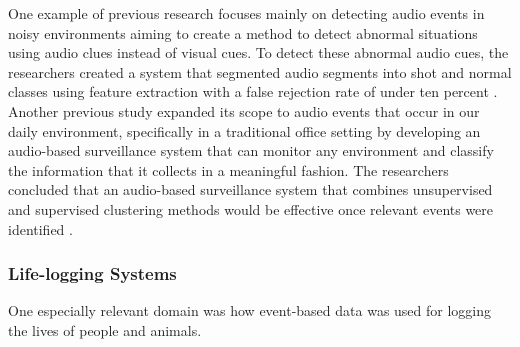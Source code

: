 \documentclass[doublespace,draft,nopageskip]{VTthesis} %
\begin{document}
One example of previous research focuses mainly on detecting audio events in noisy environments aiming to create a method to detect abnormal situations using audio clues instead of visual cues. To detect these abnormal audio cues, the researchers created a system that segmented audio segments into shot and normal classes using feature extraction with a false rejection rate of under ten percent \cite{clavelEventsDetectionAudioBased2005}. 
Another previous study expanded its scope to audio events that occur in our daily environment, specifically in a traditional office setting by developing an audio-based surveillance system that can monitor any environment and classify the information that it collects in a meaningful fashion. The researchers concluded that an audio-based surveillance system that combines unsupervised and supervised clustering methods would be effective once relevant events were identified \cite{harmaAutomaticSurveillanceAcoustic2005}. 

\subsubsection{Life-logging Systems}
One especially relevant domain was how event-based data was used for logging the lives of people and animals. 
\end{document}
